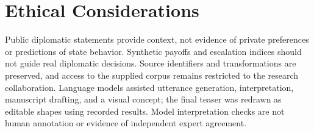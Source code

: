 \section*{Ethical Considerations}
Public diplomatic statements provide context, not evidence of private preferences or predictions of state behavior. Synthetic payoffs and escalation indices should not guide real diplomatic decisions. Source identifiers and transformations are preserved, and access to the supplied corpus remains restricted to the research collaboration. Language models assisted utterance generation, interpretation, manuscript drafting, and a visual concept; the final teaser was redrawn as editable shapes using recorded results. Model interpretation checks are not human annotation or evidence of independent expert agreement.
